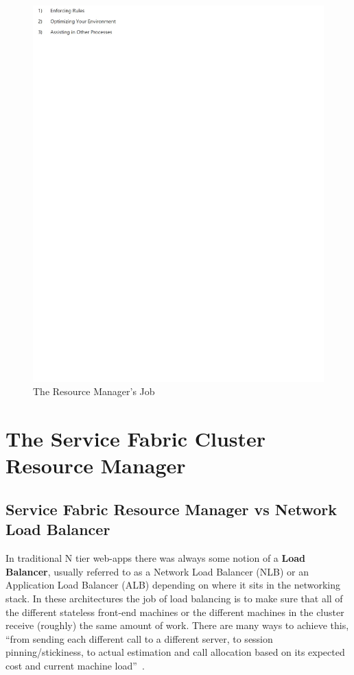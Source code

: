 \begin{figure}[!ht]
  \centering\includegraphics[width=\columnwidth]{images/fig3.pdf}
  \caption{The Resource Manager's Job~\cite{hid-sp18-501-fig2and3}}
\label{f:architecture}
\end{figure}


\section{The Service Fabric Cluster Resource Manager}

\subsection{Service Fabric Resource Manager vs Network Load Balancer}

In traditional N tier web-apps there was always some notion of a {\bf Load
Balancer}, usually referred to as a Network Load Balancer (NLB) or an
Application Load Balancer (ALB) depending on where it sits in the
networking stack. In these architectures the job of load balancing is
to make sure that all of the different stateless front-end machines or
the different machines in the cluster receive (roughly) the same
amount of work. There are many ways to achieve this, ``from sending each
different call to a different server, to session pinning/stickiness,
to actual estimation and call allocation based on its expected cost
and current machine load''~\cite{hid-sp18-501-fig2and3}.

